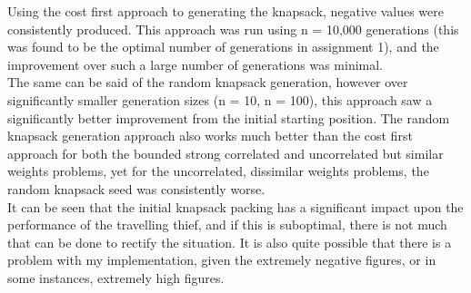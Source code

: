 \documentclass[a4paper, 12pt]{article}
\begin{document}
Using the cost first approach to generating the knapsack, negative values were consistently produced. This approach was run using n = 10,000 generations (this was found to be the optimal number of generations in assignment 1), and the improvement over such a large number of generations was minimal. \\

The same can be said of the random knapsack generation, however over significantly smaller generation sizes (n = 10, n = 100), this approach saw a significantly better improvement from the initial starting position. The random knapsack generation approach also works much better than the cost first approach for both the bounded strong correlated and uncorrelated but similar weights problems, yet for the uncorrelated, dissimilar weights problems, the random knapsack seed was consistently worse. \\

It can be seen that the initial knapsack packing has a significant impact upon the performance of the travelling thief, and if this is suboptimal, there is not much that can be done to rectify the situation. It is also quite possible that there is a problem with my implementation, given the extremely negative figures, or in some instances, extremely high figures. 
\end{document}
